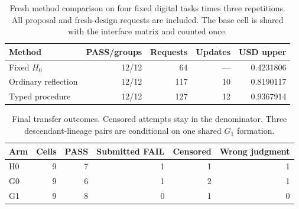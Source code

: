 \begin{table}[htbp]
\centering\small
\begin{tabular}{@{}lrrrr@{}}
\toprule
Method & PASS/groups & Requests & Updates & USD upper \\
\midrule

Fixed $H_0$ & 12/12 & 64 & --- & 0.4231806 \\

Ordinary reflection & 12/12 & 117 & 10 & 0.8190117 \\

Typed procedure & 12/12 & 127 & 12 & 0.9367914 \\

\bottomrule
\end{tabular}
\caption{Fresh method comparison on four fixed digital tasks times three repetitions. All proposal and fresh-design requests are included. The base cell is shared with the interface matrix and counted once.}\label{tab:methods}
\end{table}

\begin{table}[htbp]
\centering\small
\begin{tabular}{@{}lrrrrr@{}}
\toprule
Arm & Cells & PASS & Submitted FAIL & Censored & Wrong judgment \\
\midrule

H0 & 9 & 7 & 1 & 1 & 1 \\

G0 & 9 & 6 & 1 & 2 & 1 \\

G1 & 9 & 8 & 0 & 1 & 0 \\

\bottomrule
\end{tabular}
\caption{Final transfer outcomes. Censored attempts stay in the denominator. Three descendant-lineage pairs are conditional on one shared $G_1$ formation.}\label{tab:final}
\end{table}

